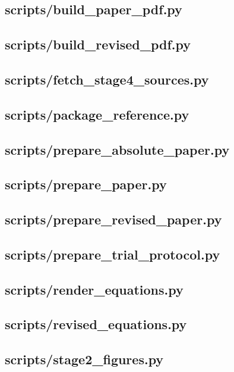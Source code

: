 \documentclass{mathorcup-journal}
\begin{document}
\subsection*{scripts/build\_paper\_pdf.py}

\subsection*{scripts/build\_revised\_pdf.py}

\subsection*{scripts/fetch\_stage4\_sources.py}

\subsection*{scripts/package\_reference.py}

\subsection*{scripts/prepare\_absolute\_paper.py}

\subsection*{scripts/prepare\_paper.py}

\subsection*{scripts/prepare\_revised\_paper.py}

\subsection*{scripts/prepare\_trial\_protocol.py}

\subsection*{scripts/render\_equations.py}

\subsection*{scripts/revised\_equations.py}

\subsection*{scripts/stage2\_figures.py}

\end{document}
